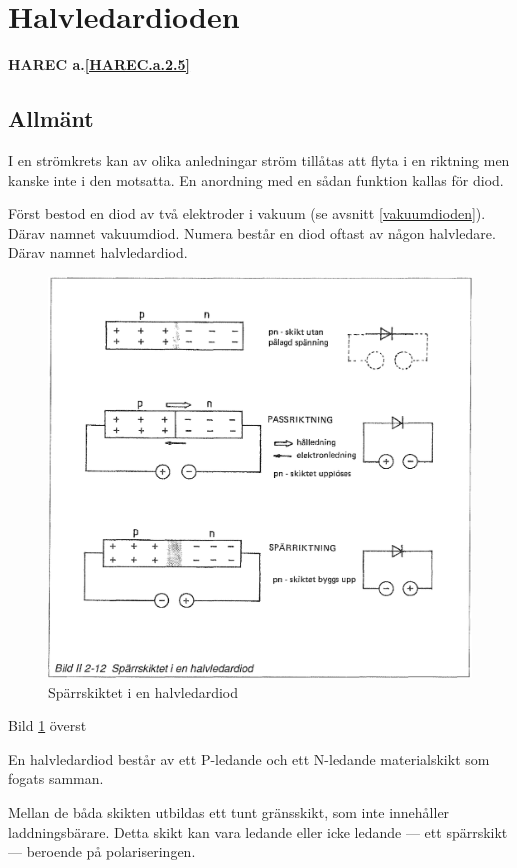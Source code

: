 \section{Halvledardioden}
\textbf{HAREC a.\ref{HAREC.a.2.5}\label{myHAREC.a.2.5}}

\subsection{Allmänt}
I en strömkrets kan av olika anledningar ström tillåtas att flyta i en riktning
men kanske inte i den motsatta. En anordning med en sådan funktion kallas för
diod.

Först bestod en diod av två elektroder i vakuum (se avsnitt
\ref{vakuumdioden}). Därav namnet vakuumdiod.
Numera består en diod oftast av någon halvledare. Därav namnet halvledardiod.

\begin{figure}
\includegraphics[width=\textwidth]{images/bild_2_2-12}
\caption{Spärrskiktet i en halvledardiod}
\label{fig:BildII2-12}
\end{figure}

Bild \ref{fig:BildII2-12} överst

En halvledardiod består av ett P-ledande och ett N-ledande materialskikt som
fogats samman.

Mellan de båda skikten utbildas ett tunt gränsskikt, som inte innehåller
laddningsbärare. Detta skikt kan vara ledande eller icke ledande --- ett
spärrskikt --- beroende på polariseringen.

